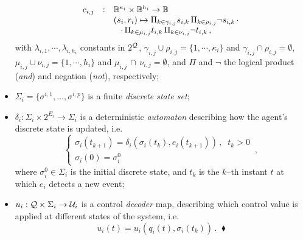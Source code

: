 \documentclass[journal, onecolumn, 12pt]{styles/IEEEtran}
\begin{document}
\begin{definition}
\begin{itemize}
\begin{equation}
\label{eq:detector-map}
\begin{array}{rcl}
c_{i,j} & : & \bool^{\kappa_i} \times \bool^{h_i} \rightarrow \bool \\
& & (s_i, r_i) \mapsto \Pi_{k \in \gamma_{i,j}} s_{i,k} \, \Pi_{k \in \rho_{i,j}} \neg s_{i,k} \, \cdot \\
& & \;\;\; \cdot \, \Pi_{k \in \mu_{i,j}}  t_{i,k} \, \Pi_{k \in \nu_{i,j}} \neg t_{i,k} \, ,
\end{array}
\end{equation}
with $\lambda_{i,1}, \cdots, \lambda_{i,h_i}$ constants in $2^{\mathcal{Q}}$,
$\gamma_{i,j} \cup \rho_{i,j} = \{1, \cdots, \kappa_i \}$ and
$\gamma_{i,j} \cap \rho_{i,j} = \emptyset$, $\mu_{i,j} \cup \nu_{i,j}
= \{1, \cdots, h_i \}$ and $\mu_{i,j} \, \cap \, \nu_{i,j} =
\emptyset$, and $\Pi$ and $\neg$ the logical product ({\em and}) and
negation ({\em not}), respectively; 
\item
$\Sigma_i = \{ \sigma^{i,1}, \dots, \sigma^{i,p} \}$ is a finite {\em
  discrete state set};
\item
$\delta_i : \Sigma_i \times 2^{E_i} \rightarrow \Sigma_i$ is a deterministic {\em automaton} describing how the agent's discrete state is updated, i.e.
\begin{equation*}
\left\lbrace
\begin{array}{l}
\sigma_i(t_{k+1}) = \delta_i(\sigma_i(t_{k}), e_i(t_{k+1}))  \, , \;\; t_k > 0\\
\sigma_i(0) = \sigma_i^0 
\end{array}
\right. 
\, ,
\label{eq:model-manager}
\end{equation*}
where $\sigma_i^0  \in \Sigma_i$ is the initial discrete state, and $t_k$ is the $k$--th instant $t$ at which $e_i$ detects a new event;%

\item
$u_i : \mathcal{Q} \times \Sigma_i \rightarrow \mathcal{U}_i$ is a control {\em decoder} map, describing which control value is applied at different states
  of the system, i.e.  
$$
u_i(t) = u_i(q_i(t), \sigma_i(t_k)) \, . \;\; \blacklozenge
$$
\end{itemize}
\end{definition}
\end{document}
